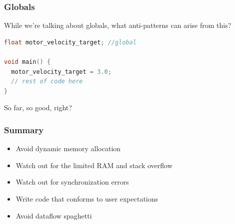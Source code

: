 \documentclass{beamer}
\begin{document}
\begin{frame}[fragile]
\frametitle{Globals}
While we're talking about globals, what anti-patterns can arise from this?
\vspace{10px}
\begin{lstlisting}[language=C++,basicstyle=\ttfamily\scriptsize]
float motor_velocity_target; //global

void main() {
  motor_velocity_target = 3.0;
  // rest of code here
}
\end{lstlisting}
\vspace{10px}
So far, so good, right? \\
\vspace{10px}
\vspace{10px}
\end{frame}

\begin{frame}
\frametitle{Summary}
\begin{itemize}
  \item Avoid dynamic memory allocation
  \item Watch out for the limited RAM and stack overflow
  \item Watch out for synchronization errors
  \item Write code that conforms to user expectations
  \item Avoid dataflow spaghetti
\end{itemize}
\end{frame}
\end{document}
